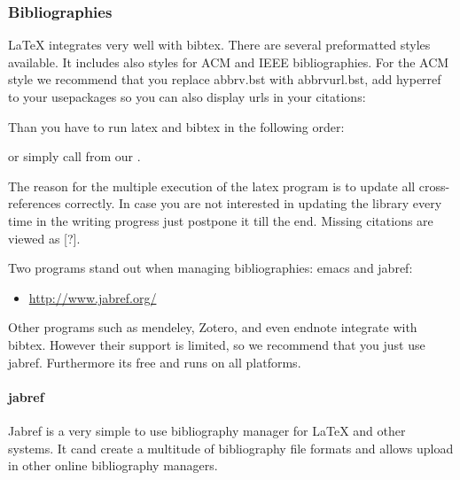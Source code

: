 \subsubsection{Bibliographies}
\label{\detokenize{lesson/doc/latex:bibliographies}}\label{\detokenize{lesson/doc/latex:bibligraphies}}
LaTeX integrates very well with bibtex. There are several preformatted
styles available. It includes also styles for ACM and IEEE
bibliographies. For the ACM style we recommend that you replace
abbrv.bst with abbrvurl.bst, add hyperref to your usepackages so you
can also display urls in your citations:

\begin{sphinxVerbatim}[commandchars=\\\{\}]
\PYGZbs{}
\PYGZbs{}
\end{sphinxVerbatim}

Than you have to run latex and bibtex in the following order:

\begin{sphinxVerbatim}[commandchars=\\\{\}]
  
 
  
  
\end{sphinxVerbatim}

or simply call  from our .

The reason for the multiple execution of the latex program is to update
all cross-references correctly. In case you are not interested in
updating the library every time in the writing progress just postpone it
till the end. Missing citations are viewed as {[}?{]}.

Two programs stand out when managing bibliographies: emacs and jabref:
\begin{itemize}
\item {} 
\url{http://www.jabref.org/}

\end{itemize}

Other programs such as mendeley, Zotero, and even endnote integrate
with bibtex. However their support is limited, so we recommend that
you just use jabref. Furthermore its free and runs on all platforms.


\paragraph{jabref}
\label{\detokenize{lesson/doc/latex:jabref}}
Jabref is a very simple to use bibliography manager for LaTeX and
other systems. It cand create a multitude of bibliography file formats
and allows upload in other online bibliography managers.


